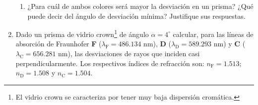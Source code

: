 \documentclass[11pt,spanish]{article}
\begin{document}
\begin{enumerate}
\begin{enumerate}
        \item ¿Para cuál de ambos colores será mayor la desviación en un prisma?
        ¿Qué puede decir del ángulo de desviación mínima? Justifique sus
        respuestas.
    \end{enumerate}


    \item Dado un prisma de vidrio crown\footnote{El vidrio crown se caracteriza
    por tener muy baja dispersión cromática.} de ángulo $\alpha=4^{\circ}$
    calcular, para las líneas de absorción de Fraunhofer \textbf{F}
    ($\lambda_\text{F} = 486.134 $ nm), \textbf{D} ($\lambda_\text{D} = 589.293
    $ nm) y \textbf{C} ($\lambda_\text{C} = 656.281$ nm), las desviaciones de
    rayos que inciden casi perpendicularmente. Los respectivos índices de
    refracción son: $n_\text{F}=1.513$; $n_\text{D}=1.508$ y $n_\text{C}=1.504$.
    
\end{enumerate}
\end{document}
